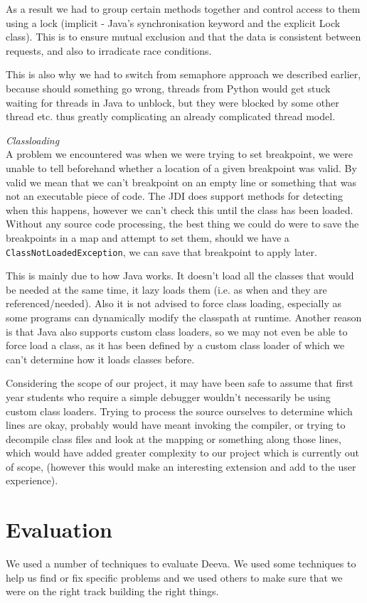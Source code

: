 \documentclass[11pt, a4paper]{article}
\begin{document}
As a result we had to group certain methods together and control access to them using a lock (implicit - Java's synchronisation keyword and the explicit Lock class).
This is to ensure mutual exclusion and that the data is consistent between requests, and also to irradicate race conditions.

This is also why we had to switch from semaphore approach we described earlier, because should something go wrong, threads from Python would get stuck waiting for threads in Java to unblock, but they were blocked by some other thread etc. thus greatly complicating an already complicated thread model.

\emph{Classloading}\\
A problem we encountered was when we were trying to set breakpoint, we were unable to tell beforehand whether a location of a given breakpoint was valid.
By valid we mean that we can't breakpoint on an empty line or something that was not an executable piece of code.
The JDI does support methods for detecting when this happens, however we can't check this until the class has been loaded.
Without any source code processing, the best thing we could do were to save the breakpoints in a map and attempt to set them, should we have a \texttt{ClassNotLoadedException}, we can save that breakpoint to apply later.

This is mainly due to how Java works. It doesn't load all the classes that would be needed at the same time, it lazy loads them (i.e. as when and they are referenced/needed).
Also it is not advised to force class loading, especially as some programs can dynamically modify the classpath at runtime.
Another reason is that Java also supports custom class loaders, so we may not even be able to force load a class, as it has been defined by a custom class loader of which we can't determine how it loads classes before.

Considering the scope of our project, it may have been safe to assume that first year students who require a simple debugger wouldn't necessarily be using custom class loaders.
Trying to process the source ourselves to determine which lines are okay, probably would have meant invoking the compiler, or trying to decompile class files and look at the mapping or something along those lines, which would have added greater complexity to our project which is currently out of scope, (however this would make an interesting extension and add to the user experience).

\section{Evaluation}
\label{sec:evaluation}
We used a number of techniques to evaluate Deeva.
We used some techniques to help us find or fix specific problems and we used others to make sure that we were on the right track building the right things.
\end{document}

